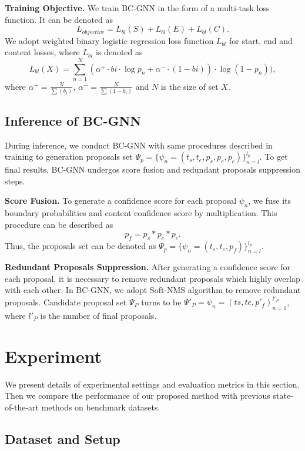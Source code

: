 \documentclass[runningheads]{llncs}
\begin{document}
\noindent\textbf{Training Objective.}
We train BC-GNN in the form of a multi-task loss function. It can be denoted as
\begin{equation}
L_{objective} = L_{bl}(S) + L_{bl}(E) + L_{bl}(C).
\end{equation}
We adopt weighted binary logistic regression loss function $L_{bl}$ for start, end and content losses, where $L_{bi}$ is denoted as
\begin{equation}
L_{bl}(X) = \sum_{n=1}^{N} (\alpha^{+} \cdot bi \cdot \log p_n + \alpha^{-} \cdot (1-bi)) \cdot \log(1-p_n)),
\end{equation}
where
$\alpha^+ = \frac{N}{\sum(b_i)}$, $\alpha^- =  \frac{N}{\sum(1-b_i)}$ and $N$ is the size of set $X$.

\subsection{Inference of BC-GNN}
During inference, we conduct BC-GNN with same procedures described in training to generation proposals set $\Psi_p = \{\psi_n = (t_s, t_e, p_s, p_e, p_c)\}_{n=l}^{l_p}$. To get final results, BC-GNN undergos score fusion and redundant proposals suppression steps.

\noindent\textbf{Score Fusion.}
To generate a confidence score for each proposal $\psi_n$, we fuse its boundary probabilities and content confidence score by multiplication. This procedure can be described as
\begin{equation}
p_{f} = p_{s} * p_{e} * p_{c}.
\end{equation}
Thus, the proposals set can be denoted as $\Psi_p = \{\psi_n = (t_s, t_e, p_f)\}_{n=l}^{l_p}$.

\noindent\textbf{Redundant Proposals Suppression.}
After generating a confidence score for each proposal, it is necessary to remove redundant proposals which highly overlap with each other. In BC-GNN, we adopt Soft-NMS algorithm to remove redundant proposals. Candidate proposal set $\Psi_P$ turns to be $\Psi'_P = {\psi_n = (ts, te, p'_f)}_{n=1}^{l'_P}$, where $l'_P$ is the number of final proposals.

\section{Experiment}
We present details of experimental settings and evaluation metrics in this section. Then we compare the performance of our proposed method with previous state-of-the-art methods on benchmark datasets.
\subsection{Dataset and Setup}
\end{document}
